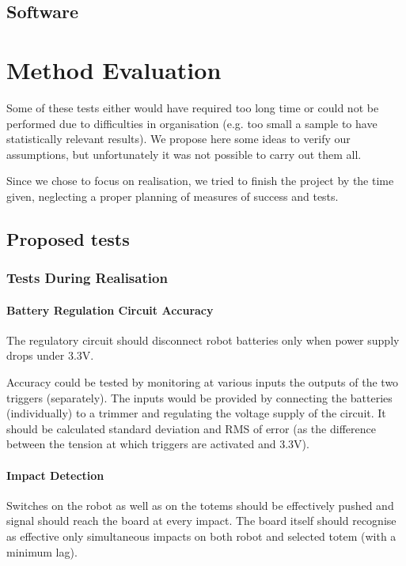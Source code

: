 \documentclass[a4paper,twoside]{book}
\newcommand{\includeDir}{include}
\begin{document}
\section{Software}
\label{sec:software}


\chapter{Method Evaluation}

Some of these tests either would have required too long time or could not be performed due to difficulties in organisation (e.g. too small a sample to have statistically relevant results). We propose here some ideas to verify our assumptions, but unfortunately it was not possible to carry out them all.

Since we chose to focus on realisation, we tried to finish the project by the time given, neglecting a proper planning of measures of success and tests.

\section{Proposed tests}

\subsection{Tests During Realisation}

\subsubsection*{Battery Regulation Circuit Accuracy}

The regulatory circuit should disconnect robot batteries only when power supply drops under 3.3V.

Accuracy could be tested by monitoring at various inputs the outputs of the two triggers (separately). The inputs would be provided by connecting the batteries (individually) to a trimmer and regulating the voltage supply of the circuit. It should be calculated standard deviation and RMS of error (as the difference between the tension at which triggers are activated and 3.3V).

\subsubsection*{Impact Detection}

Switches on the robot as well as on the totems should be effectively pushed and signal should reach the board at every impact.
The board itself should recognise as effective only simultaneous impacts on both robot and selected totem (with a minimum lag).
\end{document}
